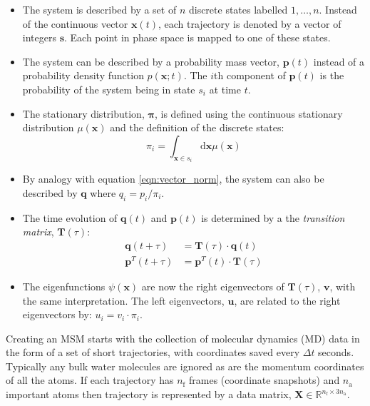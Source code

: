 \begin{itemize}
    \item The system is described by a set of $n$ discrete states labelled $1, \ldots, n$. Instead of the continuous vector $\mathbf{x}(t)$, each trajectory is denoted by a vector of integers $\mathbf{s}$. Each point in phase space is mapped to one of these states. 
    \item The system can be described by a probability mass vector, $\mathbf{p}(t)$  instead of a probability density function $p(\mathbf{x};t)$. The $i$th component of $\mathbf{p}(t)$ is the probability of the system being in  state $s_{i}$ at time $t$.
    \item The stationary distribution, $\bm{\pi}$, is defined using the continuous stationary distribution $\mu(\mathbf{x})$ and the definition of the discrete states: 
        \begin{equation}
            \pi_{i}=\int_{\mathbf{x} \in s_{i}} \mathrm{d}\mathbf{x}\mu(\mathbf{x})
        \end{equation}
    \item By analogy with equation \ref{eqn:vector_norm}, the system can also be described by $\mathbf{q}$ where $q_{i} = p_{i}/\pi_{i}$.
    \item The time evolution of $\mathbf{q}(t)$ and $\mathbf{p}(t)$ is determined by a the \emph{transition matrix}, $\mathbf{T}(\tau)$:
        \begin{align}
            \mathbf{q}(t+\tau) &= \mathbf{T}(\tau) \cdot \mathbf{q}(t) \\
            \mathbf{p}^{T}(t+\tau) & = \mathbf{p}^{T}(t)\cdot \mathbf{T}(\tau)
        \end{align}
    \item The eigenfunctions $\psi(\mathbf{x})$ are now the right eigenvectors of $\mathbf{T}(\tau)$, $\mathbf{v}$, with the same interpretation. The left eigenvectors, $\mathbf{u}$, are related to the right eigenvectors by: $u_{i} = v_{i}\cdot \pi_{i}$.  
 \end{itemize}

Creating an MSM starts with the collection of molecular dynamics (MD) data in the form of a set of short trajectories, with coordinates saved every $\Delta t$ seconds. Typically any bulk water molecules are ignored as are the momentum coordinates of all the atoms. If  each trajectory has $n_{\mathrm{f}}$ frames (coordinate snapshots) and $n_{\mathrm{a}}$ important atoms then trajectory is represented by a data matrix, $\mathbf{X} \in \mathbb{R}^{n_{\mathrm{f}} \times 3n_{\mathrm{a}}}$. 


